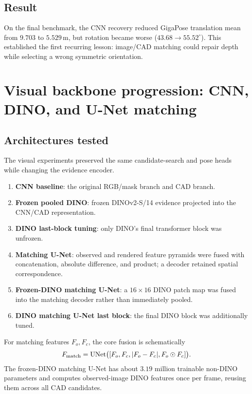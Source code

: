 \documentclass[11pt]{article}
\newcommand{\unitm}{\,\mathrm{m}}
\newcommand{\unitdeg}{^{\circ}}
\begin{document}
\subsection{Result}

On the final benchmark, the CNN recovery reduced GigaPose translation mean from $9.703$ to $5.529\unitm$, but rotation became worse ($43.68\rightarrow55.52\unitdeg$).  This established the first recurring lesson: image/CAD matching could repair depth while selecting a wrong symmetric orientation.

\section{Visual backbone progression: CNN, DINO, and U-Net matching}

\subsection{Architectures tested}

The visual experiments preserved the same candidate-search and pose heads while changing the evidence encoder.
\begin{enumerate}
\item \textbf{CNN baseline}: the original RGB/mask branch and CAD branch.
\item \textbf{Frozen pooled DINO}: frozen DINOv2-S/14 evidence projected into the CNN/CAD representation.
\item \textbf{DINO last-block tuning}: only DINO's final transformer block was unfrozen.
\item \textbf{Matching U-Net}: observed and rendered feature pyramids were fused with concatenation, absolute difference, and product; a decoder retained spatial correspondence.
\item \textbf{Frozen-DINO matching U-Net}: a $16\times16$ DINO patch map was fused into the matching decoder rather than immediately pooled.
\item \textbf{DINO matching U-Net last block}: the final DINO block was additionally tuned.
\end{enumerate}

For matching features $F_o,F_c$, the core fusion is schematically
\begin{equation}
F_{\rm match}=\operatorname{UNet}\bigl([F_o,F_c,|F_o-F_c|,F_o\odot F_c]\bigr).
\end{equation}
The frozen-DINO matching U-Net has about $3.19$ million trainable non-DINO parameters and computes observed-image DINO features once per frame, reusing them across all CAD candidates.
\end{document}
